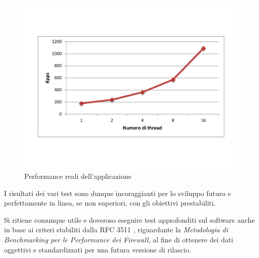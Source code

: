 \begin{figure}[H]
\begin{center}
\includegraphics[scale=0.5]{img/perf.pdf}
\caption{Performance reali dell'applicazione}\label{perf}
\end{center}
\end{figure}

I risultati dei vari test sono dunque incoraggianti per lo sviluppo futuro e perfettamente in linea, se non superiori, con gli obiettivi prestabiliti.

Si ritiene comunque utile e doveroso eseguire test approfonditi sul software anche in base ai criteri stabiliti dalla RFC 3511 \cite{rfc3511}, riguardante la \emph{Metodologia di Benchmarking per le Performance dei Firewall}, al fine di ottenere dei dati oggettivi e standardizzati per una futura versione di rilascio.